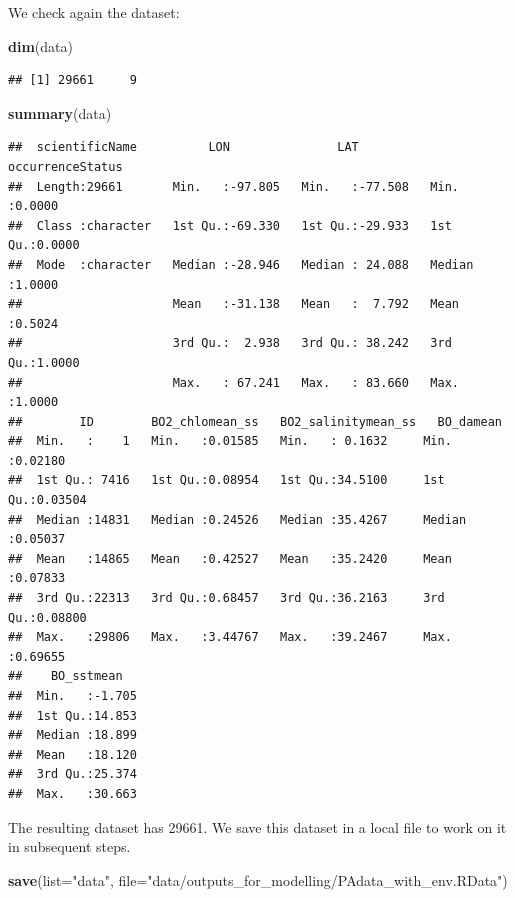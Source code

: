 \documentclass[
]{book}
\newenvironment{Shaded}{\begin{snugshade}}{\end{snugshade}}
\newcommand{\AttributeTok}[1]{\textcolor[rgb]{0.13,0.29,0.53}{#1}}
\newcommand{\FunctionTok}[1]{\textcolor[rgb]{0.13,0.29,0.53}{\textbf{#1}}}
\newcommand{\NormalTok}[1]{#1}
\newcommand{\StringTok}[1]{\textcolor[rgb]{0.31,0.60,0.02}{#1}}
\begin{document}
We check again the dataset:

\begin{Shaded}
\begin{Highlighting}[]
\FunctionTok{dim}\NormalTok{(data)}
\end{Highlighting}
\end{Shaded}

\begin{verbatim}
## [1] 29661     9
\end{verbatim}

\begin{Shaded}
\begin{Highlighting}[]
\FunctionTok{summary}\NormalTok{(data) }
\end{Highlighting}
\end{Shaded}

\begin{verbatim}
##  scientificName          LON               LAT          occurrenceStatus
##  Length:29661       Min.   :-97.805   Min.   :-77.508   Min.   :0.0000  
##  Class :character   1st Qu.:-69.330   1st Qu.:-29.933   1st Qu.:0.0000  
##  Mode  :character   Median :-28.946   Median : 24.088   Median :1.0000  
##                     Mean   :-31.138   Mean   :  7.792   Mean   :0.5024  
##                     3rd Qu.:  2.938   3rd Qu.: 38.242   3rd Qu.:1.0000  
##                     Max.   : 67.241   Max.   : 83.660   Max.   :1.0000  
##        ID        BO2_chlomean_ss   BO2_salinitymean_ss   BO_damean      
##  Min.   :    1   Min.   :0.01585   Min.   : 0.1632     Min.   :0.02180  
##  1st Qu.: 7416   1st Qu.:0.08954   1st Qu.:34.5100     1st Qu.:0.03504  
##  Median :14831   Median :0.24526   Median :35.4267     Median :0.05037  
##  Mean   :14865   Mean   :0.42527   Mean   :35.2420     Mean   :0.07833  
##  3rd Qu.:22313   3rd Qu.:0.68457   3rd Qu.:36.2163     3rd Qu.:0.08800  
##  Max.   :29806   Max.   :3.44767   Max.   :39.2467     Max.   :0.69655  
##    BO_sstmean    
##  Min.   :-1.705  
##  1st Qu.:14.853  
##  Median :18.899  
##  Mean   :18.120  
##  3rd Qu.:25.374  
##  Max.   :30.663
\end{verbatim}

The resulting dataset has 29661. We save this dataset in a local file to work on it in subsequent steps.

\begin{Shaded}
\begin{Highlighting}[]
\FunctionTok{save}\NormalTok{(}\AttributeTok{list=}\StringTok{"data"}\NormalTok{, }\AttributeTok{file=}\StringTok{"data/outputs\_for\_modelling/PAdata\_with\_env.RData"}\NormalTok{)}
\end{Highlighting}
\end{Shaded}
\end{document}
